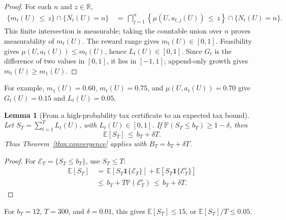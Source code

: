 \documentclass{article} %
\newtheorem{lemma}[theorem]{Lemma}
\begin{document}
\begin{proof}
For each \(n\) and \(z\in\mathbb R\),
\begin{equation}
\begin{aligned}
\{m_t(U)\,\le\, z\}\cap\{N_t(U)=n\}
&\,=\,
\bigcap_{j=1}^{n}
\left\{
\mu\!\left(U,a_{t,j}(U)\right)\,\le\, z
\right\}
\cap
\{N_t(U)=n\}.
\end{aligned}
\end{equation}
This finite intersection is measurable; taking the countable union over
\(n\) proves measurability of \(m_t(U)\).  The reward range gives
\(m_t(U)\in[0,1]\).  Feasibility gives
\(\mu(U,a_t(U))\leq m_t(U)\), hence \(L_t(U)\in[0,1]\).  Since \(G_t\) is the
difference of two values in \([0,1]\), it lies in \([-1,1]\); append-only
growth gives \(m_t(U)\geq m_1(U)\).
\end{proof}

For example, \(m_1(U)=0.60\), \(m_t(U)=0.75\), and
\(\mu(U,a_t(U))=0.70\) give \(G_t(U)=0.15\) and \(L_t(U)=0.05\).

\begin{lemma}[From a high-probability tax certificate to an expected tax bound]
\label{lem:6}
Let \(S_T=\sum_{t=1}^T L_t(U)\), with \(L_t(U)\in[0,1]\).  If
\(\mathbb P(S_T\leq b_T)\geq1-\delta\), then
\begin{equation}
\mathbb{E}[S_T]
\,\leq\,
b_T+\delta T.
\end{equation}
Thus Theorem~\ref{thm:convergence} applies with \(B_T=b_T+\delta T\).
\end{lemma}

\begin{proof}
For \(\mathcal E_T=\{S_T\leq b_T\}\), use \(S_T\leq T\):
\begin{equation}
\begin{aligned}
\mathbb{E}[S_T]
&\,=\,
\mathbb{E}[S_T\mathbf{1}\{\mathcal{E}_T\}]
+
\mathbb{E}[S_T\mathbf{1}\{\mathcal{E}_T^{c}\}] \\
&\,\leq\,
b_T+T\mathbb P(\mathcal E_T^c)
\,\leq\,b_T+\delta T.
\end{aligned}
\end{equation}
\end{proof}

For \(b_T=12\), \(T=300\), and \(\delta=0.01\), this gives
\(\mathbb E[S_T]\leq15\), or \(\mathbb E[S_T]/T\leq0.05\).
\end{document}
